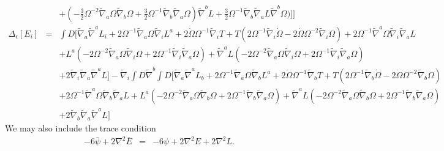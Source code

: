 \documentclass[10pt,letterpaper]{article}
\numberwithin{equation}{section}
\begin{document}
\begin{eqnarray}
&& + (- \tfrac{3}{2} \Omega^{-2} \tilde{\nabla}_{a}\Omega \tilde{\nabla}_{b}\Omega + \tfrac{3}{2} \Omega^{-1} \tilde{\nabla}_{b}\tilde{\nabla}_{a}\Omega) \tilde{\nabla}^{b}L + \tfrac{3}{2} \Omega^{-1} \tilde{\nabla}_{b}\tilde{\nabla}_{a}L \tilde{\nabla}^{b}\Omega 
\bigg)\bigg]\Bigg]
\nonumber\\
%
\Delta_\epsilon[E_i] &=& \int D \bigg[ \tilde{\nabla}_{a}\tilde{\nabla}^{a}L_{i} + 2 \Omega^{-1} \tilde{\nabla}_{a}\Omega \tilde{\nabla}_{i}L^{a} + 2 \dot{\Omega} \Omega^{-1} \tilde{\nabla}_{i}T + T (2 \Omega^{-1} \tilde{\nabla}_{i}\dot{\Omega} - 2 \dot{\Omega} \Omega^{-2} \tilde{\nabla}_{i}\Omega) + 2 \Omega^{-1} \tilde{\nabla}^{a}\Omega \tilde{\nabla}_{i}\tilde{\nabla}_{a}L \nonumber \\ 
&& + L^{a} (-2 \Omega^{-2} \tilde{\nabla}_{a}\Omega \tilde{\nabla}_{i}\Omega + 2 \Omega^{-1} \tilde{\nabla}_{i}\tilde{\nabla}_{a}\Omega) + \tilde{\nabla}^{a}L (-2 \Omega^{-2} \tilde{\nabla}_{a}\Omega \tilde{\nabla}_{i}\Omega + 2 \Omega^{-1} \tilde{\nabla}_{i}\tilde{\nabla}_{a}\Omega) \nonumber \\ 
&& + 2 \tilde{\nabla}_{i}\tilde{\nabla}_{a}\tilde{\nabla}^{a}L \bigg]
- \tilde\nabla_i \int D \tilde\nabla^b \int D \bigg[ 
 \tilde{\nabla}_{a}\tilde{\nabla}^{a}L_{b} + 2 \Omega^{-1} \tilde{\nabla}_{a}\Omega \tilde{\nabla}_{b}L^{a} + 2 \dot{\Omega} \Omega^{-1} \tilde{\nabla}_{b}T + T (2 \Omega^{-1} \tilde{\nabla}_{b}\dot{\Omega} - 2 \dot{\Omega} \Omega^{-2} \tilde{\nabla}_{b}\Omega) \nonumber\\
&& + 2 \Omega^{-1} \tilde{\nabla}^{a}\Omega \tilde{\nabla}_{b}\tilde{\nabla}_{a}L  + L^{a} (-2 \Omega^{-2} \tilde{\nabla}_{a}\Omega \tilde{\nabla}_{b}\Omega + 2 \Omega^{-1} \tilde{\nabla}_{b}\tilde{\nabla}_{a}\Omega) + \tilde{\nabla}^{a}L (-2 \Omega^{-2} \tilde{\nabla}_{a}\Omega \tilde{\nabla}_{b}\Omega + 2 \Omega^{-1} \tilde{\nabla}_{b}\tilde{\nabla}_{a}\Omega) \nonumber \\ 
&& + 2 \tilde{\nabla}_{b}\tilde{\nabla}_{a}\tilde{\nabla}^{a}L
\bigg]
\end{eqnarray}
We may also include the trace condition
\begin{eqnarray}
-6\bar \psi + 2\nabla^2 \bar E &=& -6 \psi + 2\nabla^2 E +2 \nabla^2 L.
\end{eqnarray}

\end{document}

